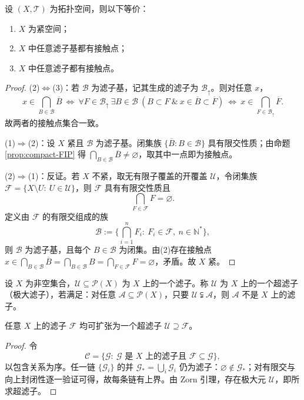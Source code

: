 \documentclass[lang=cn,a4paper,newtx,figureplace=section,tableplace=section]{elegantbook}
\begin{document}
  \begin{proposition}\label{prop:compact-filter-cluster}
  设 $(X,\mathcal T)$ 为拓扑空间，则以下等价：
  \begin{enumerate}
    \item $X$ 为紧空间；
    \item $X$ 中任意滤子基都有接触点；
    \item $X$ 中任意滤子都有接触点。
  \end{enumerate}
  \end{proposition}
  \begin{proof}
  (2)$\Leftrightarrow$(3)：若 $\mathcal B$ 为滤子基，记其生成的滤子为 $\mathcal B_{\uparrow}$。则对任意 $x$，
  \[
  x\in \bigcap_{B\in\mathcal B}\overline{B}
  \ \Longleftrightarrow\ 
  \forall F\in \mathcal B_{\uparrow}\ \exists B\in\mathcal B\ (B\subset F\ \&\ x\in\overline{B}\subset \overline{F})
  \ \Longleftrightarrow\ 
  x\in \bigcap_{F\in\mathcal B_{\uparrow}}\overline{F}.
  \]
  故两者的接触点集合一致。
  
  (1)$\Rightarrow$(2)：设 $X$ 紧且 $\mathcal B$ 为滤子基。闭集族 $\{\overline{B}:B\in\mathcal B\}$ 具有限交性质；由命题 \ref{prop:compact-FIP} 得 $\bigcap_{B\in\mathcal B}\overline{B}\ne\varnothing$，取其中一点即为接触点。
  
  (2)$\Rightarrow$(1)：反证。若 $X$ 不紧，取无有限子覆盖的开覆盖 $\mathcal U$，令闭集族 $\mathcal F=\{X\setminus U:\ U\in\mathcal U\}$，则 $\mathcal F$ 具有有限交性质且
  \[
  \bigcap_{F\in\mathcal F}F=\varnothing.
  \]
  定义由 $\mathcal F$ 的有限交组成的族
  \[
  \mathcal B:=\Big\{\bigcap_{i=1}^n F_i:\ F_i\in\mathcal F,\ n\in\mathbb N^*\Big\},
  \]
  则 $\mathcal B$ 为滤子基，且每个 $B\in\mathcal B$ 为闭集。由(2)存在接触点 $x\in \bigcap_{B\in\mathcal B}\overline{B}=\bigcap_{B\in\mathcal B}B=\bigcap_{F\in\mathcal F}F=\varnothing$，矛盾。故 $X$ 紧。
  \end{proof}
  

  \begin{definition}[超滤子]\label{def:ultrafilter}
  设 $X$ 为非空集合，$\mathcal U\subseteq\mathcal P(X)$ 为 $X$ 上的一个滤子。称 $\mathcal U$ 为 $X$ 上的一个超滤子（极大滤子），若满足：对任意 $\mathcal A\subseteq\mathcal P(X)$，只要 $\mathcal U\subsetneqq\mathcal A$，则 $\mathcal A$ 不是 $X$ 上的滤子。
  \end{definition}
  
  \begin{proposition}[超滤子引理]\label{prop:ultrafilter-extension}
  任意 $X$ 上的滤子 $\mathcal F$ 均可扩张为一个超滤子 $\mathcal U\supseteq\mathcal F$。
  \end{proposition}
  \begin{proof}
  令
  \[
  \mathcal C=\{\mathcal G:\ \mathcal G \text{ 是 $X$ 上的滤子且 }\mathcal F\subseteq\mathcal G\},
  \]
  以包含关系为序。任一链 $\{\mathcal G_i\}$ 的并 $\mathcal G_*=\bigcup_i\mathcal G_i$ 仍为滤子：$\varnothing\notin\mathcal G_*$；对有限交与向上封闭性逐一验证可得，故每条链有上界。由 Zorn 引理，存在极大元 $\mathcal U$，即所求超滤子。
  \end{proof}
\end{document}
